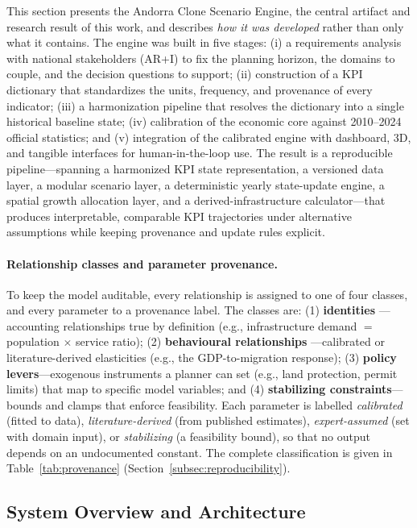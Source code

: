 \documentclass[urbansci,article,submit,pdftex,moreauthors]{Definitions/mdpi}
\begin{document}
This section presents the Andorra Clone Scenario Engine, the central artifact and
research result of this work, and describes \emph{how it was developed} rather than
only what it contains. The engine was built in five stages: (i) a requirements
analysis with national stakeholders (AR+I) to fix the planning horizon, the domains
to couple, and the decision questions to support; (ii) construction of a KPI
dictionary that standardizes the units, frequency, and provenance of every
indicator; (iii) a harmonization pipeline that resolves the dictionary into a single
historical baseline state; (iv) calibration of the economic core against 2010--2024
official statistics; and (v) integration of the calibrated engine with dashboard,
3D, and tangible interfaces for human-in-the-loop use. The result is a reproducible
pipeline---spanning a harmonized KPI state representation, a versioned data layer, a
modular scenario layer, a deterministic yearly state-update engine, a spatial growth
allocation layer, and a derived-infrastructure calculator---that produces
interpretable, comparable KPI trajectories under alternative assumptions while
keeping provenance and update rules explicit.

\paragraph{Relationship classes and parameter provenance.}
To keep the model auditable, every relationship is assigned to one of four classes,
and every parameter to a provenance label. The classes are: (1) \textbf{identities}
---accounting relationships true by definition (e.g., infrastructure demand $=$
population $\times$ service ratio); (2) \textbf{behavioural relationships}
---calibrated or literature-derived elasticities (e.g., the GDP-to-migration
response); (3) \textbf{policy levers}---exogenous instruments a planner can set
(e.g., land protection, permit limits) that map to specific model variables; and
(4) \textbf{stabilizing constraints}---bounds and clamps that enforce feasibility.
Each parameter is labelled \emph{calibrated} (fitted to data), \emph{literature-derived}
(from published estimates), \emph{expert-assumed} (set with domain input), or
\emph{stabilizing} (a feasibility bound), so that no output depends on an
undocumented constant. The complete classification is given in
Table~\ref{tab:provenance} (Section~\ref{subsec:reproducibility}).

\subsection{System Overview and Architecture}
\label{subsec:system_overview}
\end{document}
